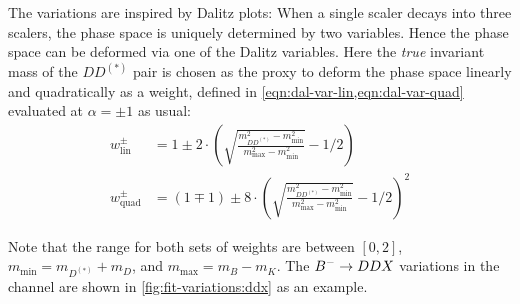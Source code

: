 The variations are inspired by Dalitz plots:
When a single scaler decays into three scalers,
the phase space is uniquely determined by two variables.
Hence the phase space can be deformed via one of the Dalitz variables.
Here the \emph{true} invariant mass of the $DD^{(*)}$ pair is chosen as the
proxy to deform the phase space linearly and quadratically
as a weight, defined in \cref{eqn:dal-var-lin,eqn:dal-var-quad} evaluated at
$\alpha = \pm 1$ as usual:
\begin{align}
    w_\text{lin}^\pm &= 1 \pm 2 \cdot
    \left(
    \sqrt{
        \frac{m_{DD^{(*)}}^2 - m_\text{min}^2}{m_\text{max}^2 - m_\text{min}^2}
    } - 1/2
    \right)
    \label{eqn:dal-var-lin} \\
    w_\text{quad}^\pm &= (1 \mp 1) \pm 8 \cdot
    \left(
    \sqrt{
        \frac{m_{DD^{(*)}}^2 - m_\text{min}^2}{m_\text{max}^2 - m_\text{min}^2}
    } - 1/2
    \right)^2
    \label{eqn:dal-var-quad}
\end{align}

Note that the range for both sets of weights are between $[0, 2]$,
$m_\text{min} = m_{D^{(*)}} + m_D$, and $m_\text{max} = m_B - m_K$.
The ${{{B}^-}} \rightarrow DDX$ variations in the \Dz channel are shown in
\cref{fig:fit-variations:ddx} as an example.


